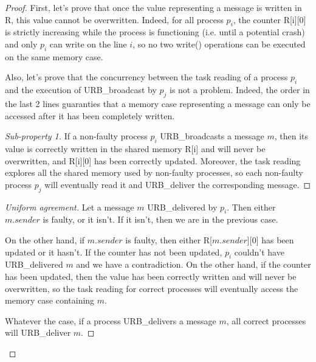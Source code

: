 \documentclass{scrartcl}
\begin{document}
\begin{proof}
First, let's prove that once the value representing a message is written in R, this value cannot be overwritten. Indeed, for all process $p_i$, the counter R[i][0] is strictly increasing while the process is functioning (i.e. until a potential crash) and only $p_i$ can write on the line $i$, so no two write() operations can be executed on the same memory case.

Also, let's prove that the concurrency between the task reading of a process $p_i$ and the execution of URB\_broadcast by $p_j$ is not a problem. Indeed, the order in the last 2 lines guaranties that a memory case representing a message can only be accessed after it has been completely written.
\renewcommand{\qedsymbol}{}
\begin{proof}[Sub-property 1]
If a non-faulty process $p_i$ URB\_broadcasts a message $m$, then its value is correctly written in the shared memory R[i] and will never be overwritten, and R[i][0] has been correctly updated. Moreover,  the task reading explores all the shared memory used by non-faulty processes, so each non-faulty process $p_j$ will eventually read it and URB\_deliver the corresponding message.
\end{proof}
\begin{proof}[Uniform agreement]
Let a message $m$ URB\_delivered by $p_i$. Then either $m.sender$ is faulty, or it isn't. If it isn't, then we are in the previous case.

On the other hand, if $m.sender$ is faulty, then either R[$m.sender$][0] has been updated or it hasn't. If the counter has not been updated, $p_i$ couldn't have URB\_delivered $m$ and we have a contradiction. On the other hand, if the counter has been updated, then the value has been correctly written and will never be overwritten, so the task reading for correct processes will eventually access the memory case containing $m$.

Whatever the case, if a process URB\_delivers a message $m$, all correct processes will URB\_deliver $m$.
\end{proof}
\end{proof}
\end{document}
